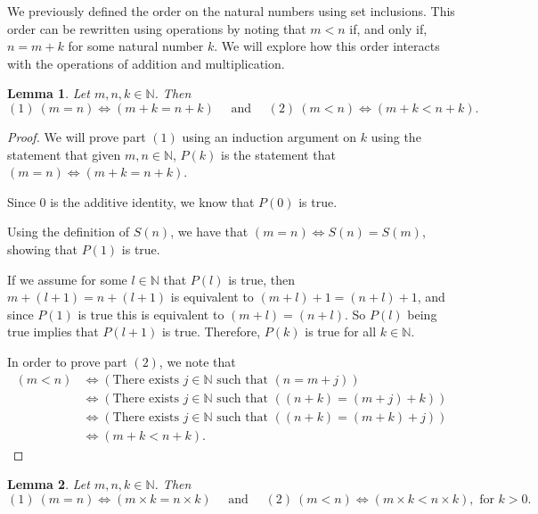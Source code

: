 \documentclass[
]{book}
\newtheorem{lemma}{Lemma}[chapter]
\theoremstyle{definition}
\theoremstyle{definition}
\theoremstyle{definition}
\theoremstyle{definition}
\theoremstyle{remark}
\begin{document}
We previously defined the order on the natural numbers using set inclusions. This order can be rewritten using operations by noting that \(m<n\) if, and only if, \(n=m+k\) for some natural number \(k\). We will explore how this order interacts with the operations of addition and multiplication.

\begin{lemma}
\protect\hypertarget{lem:order-addition-naturals}{}\label{lem:order-addition-naturals}Let \(m,n,k\in \mathbb{N}\). Then \[ (1) \: (m=n) \Leftrightarrow (m+k=n+k) \quad \mbox{ and } \quad (2) \: (m<n) \Leftrightarrow (m+k<n+k).\]
\end{lemma}

\begin{proof}
We will prove part \((1)\) using an induction argument on \(k\) using the statement that given \(m,n\in \mathbb{N}\), \(P(k)\) is the statement that \((m=n) \Leftrightarrow (m+k=n+k)\).

Since \(0\) is the additive identity, we know that \(P(0)\) is true.

Using the definition of \(S(n)\), we have that \((m=n) \Leftrightarrow S(n)=S(m)\), showing that \(P(1)\) is true.

If we assume for some \(l\in \mathbb{N}\) that \(P(l)\) is true, then \(m+(l+1) = n+(l+1)\) is equivalent to \((m+l)+1 = (n+l)+1\), and since \(P(1)\) is true this is equivalent to \((m+l)=(n+l)\). So \(P(l)\) being true implies that \(P(l+1)\) is true. Therefore, \(P(k)\) is true for all \(k\in \mathbb{N}\).

In order to prove part \((2)\), we note that
\begin{align*}
    (m<n) &\Leftrightarrow (\mbox{There exists } j\in \mathbb{N} \mbox{ such that } (n=m+j)) \\
    &\Leftrightarrow (\mbox{There exists } j\in \mathbb{N} \mbox{ such that } ((n+k)=(m+j)+k)) \\
    &\Leftrightarrow (\mbox{There exists } j\in \mathbb{N} \mbox{ such that } ((n+k)=(m+k)+j)) \\
    &\Leftrightarrow (m+k<n+k).        
\end{align*}
\end{proof}

\begin{lemma}
\protect\hypertarget{lem:order-multiplication-naturals}{}\label{lem:order-multiplication-naturals}Let \(m,n,k\in \mathbb{N}\). Then \[ (1) \: (m=n) \Leftrightarrow (m\times k=n\times k) \quad \mbox{ and } \quad (2) \: (m<n) \Leftrightarrow (m\times k<n\times k), \mbox{ for } k>0.\]
\end{lemma}
\end{document}
